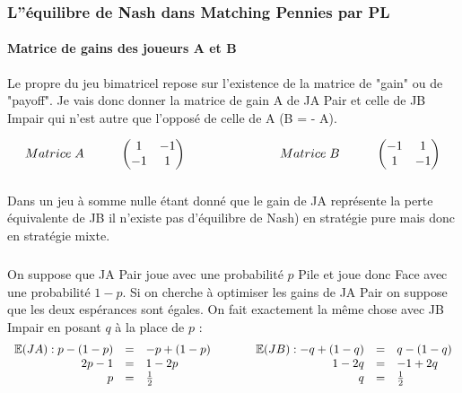 \documentclass[a4paper, 12pt, twoside]{article}
\begin{document}
{{\subsubsection{L''équilibre de Nash dans Matching Pennies par PL}
\paragraph{Matrice de gains des joueurs A et B}{Le propre  du jeu bimatricel repose sur l'existence de la matrice de "gain" ou de "payoff".  Je vais donc donner la matrice de gain A de \textsf{JA} \textsf{Pair} et celle de \textsf{JB} \textsf{Impair} qui n'est autre que l'opposé de celle de  A (B = - A).}

\[
Matrice\hspace{0,1cm} A\hspace{1cm}
\begin{pmatrix}1&-1\\
-1&1\\
\end{pmatrix}\                      \hspace{2,5cm}  
Matrice\hspace{0,1cm} B \hspace{1cm}  
\begin{pmatrix}-1&1\\
1&-1\\
\end{pmatrix} 
\]

\subparagraph*{}{Dans un jeu à \textsf{somme nulle} étant donné que le gain de JA représente la perte équivalente de JB il n'existe pas d'\textsf{équilibre de Nash) en stratégie pure mais donc en stratégie mixte.}

\subparagraph{}{On suppose que JA \textsf{Pair} joue avec une probabilité $p$ \textsf{Pile} et joue donc \textsf{Face} avec une probabilité $1-p$. Si on cherche à optimiser les gains de JA \textsf{Pair} on suppose que les deux espérances sont égales. On fait exactement la même chose avec JB \textsf{Impair} en posant $q$ à la place de $p$ :}
\begin{align*}
\begin{array}{r c l}
          \mathbb{E}(JA):p -(1-p) &=& -p + (1-p) \\
          2p -1 &=& 1 -2p \\
          p &=& \frac{1}{2}
\end{array} 
          \hspace{1 cm}
\begin{array}{r c l}
          \mathbb{E}(JB) :-q + (1-q) &=& q - (1-q) \\
          1 -2q &=& -1 +2q \\
          q &=& \frac{1}{2}
\end{array}
 \end{align*}

}}}
\end{document}
